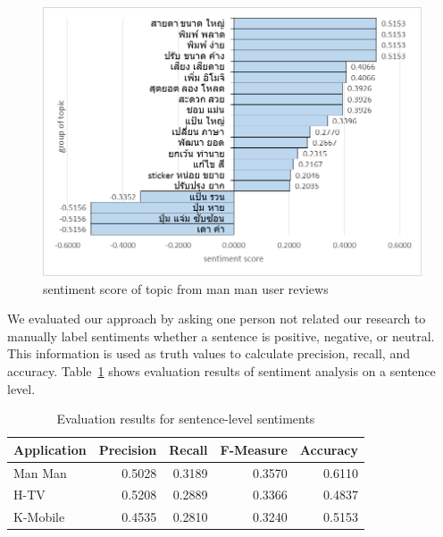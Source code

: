 \begin{figure}
	\centering
	\includegraphics[width=0.9\linewidth]{graphmanman}
	\caption{sentiment score of topic from man man user reviews}
	\label{fig:graphmanman}
\end{figure}

We evaluated our approach by asking one person not related our research to manually label sentiments whether a sentence is positive, negative, or neutral. This information is used as truth values to calculate precision, recall, and accuracy. Table~\ref{table:f-measureSenti} shows evaluation results of sentiment analysis on a sentence level.

\begin{table}[h]
	\caption{Evaluation results for sentence-level sentiments}
	\label{table:f-measureSenti}
	\centering
	\begin{tabular}{|l|r|r|r|r|}
		\hline
		\multicolumn{1}{|c|}{\textbf{Application}} &
		\multicolumn{1}{|c|}{\textbf{Precision}} &
		\multicolumn{1}{|c|}{\textbf{Recall}} &
		\multicolumn{1}{|c|}{\textbf{F-Measure}} &
		\multicolumn{1}{|c|}{\textbf{Accuracy}} \\
		\hline
		Man Man & 0.5028 & 0.3189 & 0.3570 & 0.6110\\
		\hline
		H-TV & 0.5208 & 0.2889 & 0.3366 & 0.4837 \\
		\hline
		K-Mobile & 0.4535 & 0.2810 & 0.3240 & 0.5153 \\
		\hline
	\end{tabular}
\end{table}


